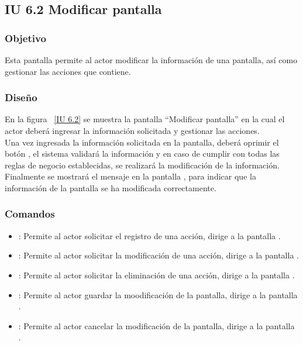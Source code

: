 \newpage 
\subsection{IU 6.2 Modificar pantalla}

\subsubsection{Objetivo}
	
	Esta pantalla permite al actor modificar la información de una pantalla, así como gestionar las acciones que contiene.

\subsubsection{Diseño}

    En la figura ~\ref{IU 6.2} se muestra la pantalla ``Modificar pantalla'' en la cual el actor deberá ingresar la información solicitada y gestionar las acciones. \\
    
    Una vez ingresada la información solicitada en la pantalla, deberá oprimir el botón , el sistema validará la información y en caso de cumplir con todas las reglas de negocio establecidas, se realizará la modificación de la información.\\
    
    Finalmente se mostrará el mensaje  en la pantalla , para indicar que la información de la pantalla se ha modificada correctamente.        



\subsubsection{Comandos}
\begin{itemize}
	\item {}: Permite al actor solicitar el registro de una acción, dirige a la pantalla .
	\item \btnEditar[Modificar]: Permite al actor solicitar la modificación de una acción, dirige a la pantalla .
	\item \btnEliminar[Eliminar]: Permite al actor solicitar la eliminación de una acción, dirige a la pantalla .
	\item {}: Permite al actor guardar la moodificación de la pantalla, dirige a la pantalla .
	\item {}: Permite al actor cancelar la modificación de la pantalla, dirige a la pantalla .
\end{itemize}

